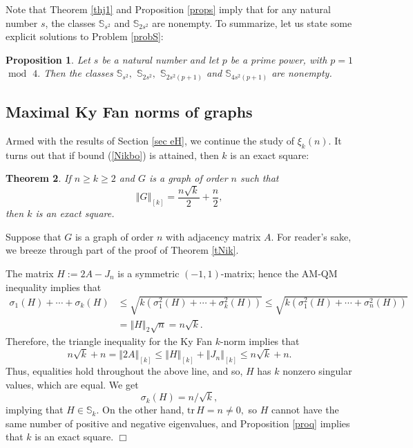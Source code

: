 \documentclass[12pt]{article}%
\newtheorem{theorem}{Theorem}[section]
\newtheorem{proposition}[theorem]{Proposition}
\newenvironment{proof}[1][Proof]{\noindent{\textbf {#1}  }}  {\hfill$\Box$\bigskip}
\begin{document}
Note that Theorem \ref{thj1} and Proposition \ref{props} imply that for any
natural number $s$, the classes $\mathbb{S}_{s^{2}}$ and $\mathbb{S}_{2s^{2}}$
are nonempty. To summarize, let us state some explicit solutions to Problem
\ref{probS}:

\begin{proposition}
\label{propE}Let $s$ be a natural number and let $p$ be a prime power, with
$p=1$ $\operatorname{mod}$ $4.$ Then the classes $\mathbb{S}_{s^{2}},$
$\mathbb{S}_{2s^{2}},$ $\mathbb{S}_{2s^{2}\left(  p+1\right)  }$ and
$\mathbb{S}_{4s^{2}\left(  p+1\right)  }$ are nonempty.
\end{proposition}

\subsection{\label{sec 2}Maximal Ky Fan norms of graphs}

Armed with the results of Section \ref{sec eH}, we continue the study of
$\xi_{k}\left(  n\right)  $. It turns out that if bound (\ref{Nikbo}) is
attained, then $k$ is an exact square:

\begin{theorem}
\label{thk}If $n\geq k\geq2$ and $G$ is a graph of order $n$ such that
\[
\left\Vert G\right\Vert _{\left[  k\right]  }=\frac{n\sqrt{k}}{2}+\frac{n}%
{2},
\]
then $k$ is an exact square.
\end{theorem}

\begin{proof}
Suppose that $G$ is a graph of order $n$ with adjacency matrix $A$. For
reader's sake, we breeze through part of the proof of Theorem \ref{tNik}.

The matrix $H:=2A-J_{n}$ is a symmetric $\left(  -1,1\right)  $-matrix; hence
the AM-QM inequality implies that%
\begin{align*}
\sigma_{1}\left(  H\right)  +\cdots+\sigma_{k}\left(  H\right)   &  \leq
\sqrt{k\left(  \sigma_{1}^{2}\left(  H\right)  +\cdots+\sigma_{k}^{2}\left(
H\right)  \right)  }\leq\sqrt{k\left(  \sigma_{1}^{2}\left(  H\right)
+\cdots+\sigma_{n}^{2}\left(  H\right)  \right)  }\\
&  =\left\Vert H\right\Vert _{2}\sqrt{n}=n\sqrt{k}.
\end{align*}
Therefore, the triangle inequality for the Ky Fan $k$-norm implies that
\[
n\sqrt{k}+n=\left\Vert 2A\right\Vert _{\left[  k\right]  }\leq\left\Vert
H\right\Vert _{\left[  k\right]  }+\left\Vert J_{n}\right\Vert _{\left[
k\right]  }\leq n\sqrt{k}+n.
\]
Thus, equalities hold throughout the above line, and so, $H$ has $k$ nonzero
singular values, which are equal. We get
\[
\sigma_{k}\left(  H\right)  =n/\sqrt{k},
\]
implying that $H\in\mathbb{S}_{k}.$ On the other hand, $\mathrm{tr\,}%
H=n\neq0,$ so $H$ cannot have the same number of positive and negative
eigenvalues, and Proposition \ref{proq} implies that $k$ is an exact square.
\end{proof}
\end{document}
